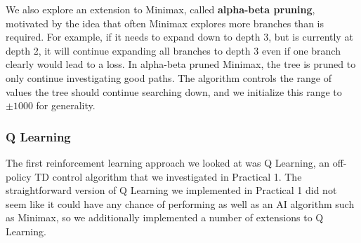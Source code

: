 \documentclass[12pt]{article}
\begin{document}
\begin{enumerate}
We also explore an extension to Minimax, called \textbf{alpha-beta pruning}, motivated by the idea that often Minimax explores more branches than is required. For example, if it needs to expand down to depth 3, but is currently at depth 2, it will continue expanding all branches to depth 3 even if one branch clearly would lead to a loss. In alpha-beta pruned Minimax, the tree is pruned to only continue investigating good paths. The algorithm controls the range of values the tree should continue searching down, and we initialize this range to $\pm 1000$ for generality.

\end{enumerate}

\subsubsection{Q Learning}

The first reinforcement learning approach we looked at was Q Learning, an off-policy TD control algorithm that we investigated in Practical 1. The straightforward version of Q Learning we implemented in Practical 1 did not seem like it could have any chance of performing as well as an AI algorithm such as Minimax, so we additionally implemented a number of extensions to Q Learning.
\end{document}
